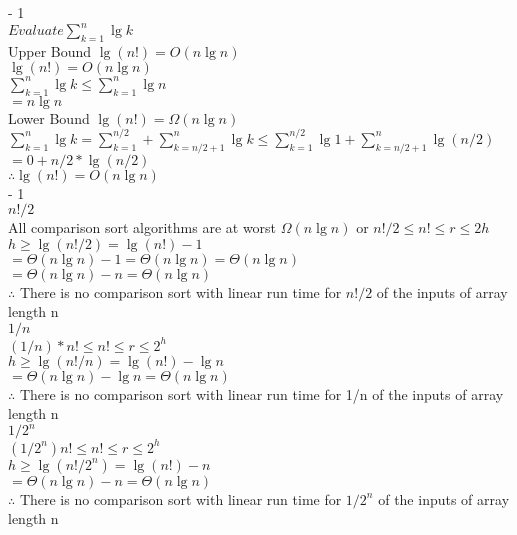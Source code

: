 \documentclass[12pt,largemargins]{homework}
\begin{document}
\maketitle

 - 1\\
$ Evaluate \sum_{k=1}^{n} \lg k $ \\
Upper Bound $ \lg (n!) = O(n \lg n) $\\
$ \lg (n!) = O(n \lg n)$ \\
$ \sum_{k=1}^{n} \lg k \leq \sum_{k=1}^{n} \lg n $\\
$ = n \lg n$\\
Lower Bound $ \lg (n!) = \Omega(n \lg n) $\\
$ \sum_{k=1}^{n} \lg k = \sum_{k=1}^{n/2} + \sum_{k=n/2 + 1}^{n} \lg k \leq \sum_{k=1}^{n/2} \lg 1 + \sum_{k=n/2+1}^{n} \lg (n/2) $\\
$ = 0 + n/2 * \lg(n/2)$ \\
$ \therefore \lg(n!) = O(n \lg n)$\\
 - 1\\
$ n! / 2 $\\
 All comparison sort algorithms are at worst $ \Omega(n \lg n) $ or $ n!/2 \leq n! \leq r \leq 2h$\\
$ h \geq \lg(n!/2) = \lg(n!) - 1 $\\
$ = \Theta(n \lg n) -1 = \Theta(n \lg n) = \Theta(n \lg n)$ \\
$ =\Theta(n \lg n) -n = \Theta(n \lg n)$\\
$ \therefore $ There is no comparison sort with linear run time for $ n!/2 $ of the inputs of array length n \\
$ 1/n $\\
$ (1/n)*n! \leq n! \leq r \leq 2^h $\\
$ h \geq \lg(n!/n) = \lg(n!) - \lg n$\\
$ =\Theta(n \lg n) - \lg n = \Theta(n \lg n)$\\
$ \therefore $ There is no comparison sort with linear run time for 1/n of the inputs of array length n \\
$ 1/2 ^ n $\\
$ (1/2^n)n! \leq n! \leq r \leq 2^h $\\
$ h \geq \lg( n!/2^n ) = \lg(n!) -n $\\
$ =\Theta(n \lg n) -n = \Theta(n \lg n)$\\
$ \therefore $ There is no comparison sort with linear run time for $ 1/2^n $ of the inputs of array length n \\
\end{document}
